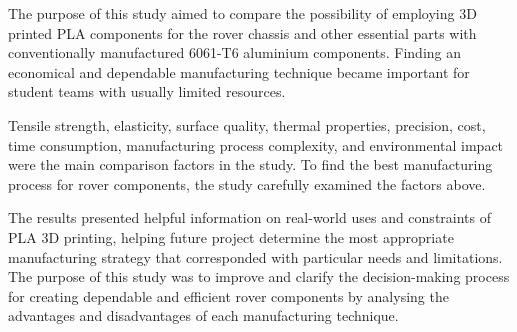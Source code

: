The purpose of this study aimed to compare the possibility of employing 3D printed PLA components for the rover chassis and other essential parts with conventionally manufactured 6061-T6 aluminium components. Finding an economical and dependable manufacturing technique became important for student teams with usually limited resources.

Tensile strength, elasticity, surface quality, thermal properties, precision, cost, time consumption, manufacturing process complexity, and environmental impact were the main comparison factors in the study. To find the best manufacturing process for rover components, the study carefully examined the factors above.

The results presented helpful information on real-world uses and constraints of PLA 3D printing, helping future project determine the most appropriate manufacturing strategy that corresponded with particular needs and limitations. The purpose of this study was to improve and clarify the decision-making process for creating dependable and efficient rover components by analysing the advantages and disadvantages of each manufacturing technique.